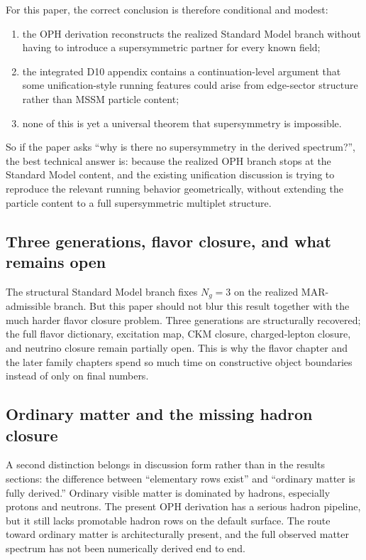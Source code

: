 \documentclass[11pt]{article}
\begin{document}
For this paper, the correct conclusion is therefore conditional and modest:
\begin{enumerate}[leftmargin=2em]
\item the OPH derivation reconstructs the realized Standard Model branch without having to
introduce a supersymmetric partner for every known field;
\item the integrated D10 appendix contains a continuation-level argument that some unification-style running
features could arise from edge-sector structure rather than MSSM particle content;
\item none of this is yet a universal theorem that supersymmetry is impossible.
\end{enumerate}

So if the paper asks ``why is there no supersymmetry in the derived spectrum?'', the best
technical answer is: because the realized OPH branch stops at the Standard
Model content, and the existing unification discussion is trying to reproduce the relevant
running behavior geometrically, without extending the particle content to a full
supersymmetric multiplet structure.

\subsection{Three generations, flavor closure, and what remains open}

The structural Standard Model branch fixes \(N_g=3\) on the realized MAR-admissible
branch. But this paper should not blur this result together with the much harder flavor
closure problem. Three generations are structurally recovered; the full flavor dictionary,
excitation map, CKM closure, charged-lepton closure, and neutrino closure remain partially open.
This is why the flavor chapter and the later family chapters spend so much time on
constructive object boundaries instead of only on final numbers.

\subsection{Ordinary matter and the missing hadron closure}

A second distinction belongs in discussion form rather than in the results sections: the
difference between ``elementary rows exist'' and ``ordinary matter is fully derived.'' Ordinary
visible matter is dominated by hadrons, especially protons and neutrons. The present OPH
derivation has a serious hadron pipeline, but it still lacks promotable hadron rows on the
default surface. The route toward ordinary matter is architecturally present, and the full
observed matter spectrum has not been numerically derived end to end.
\end{document}
